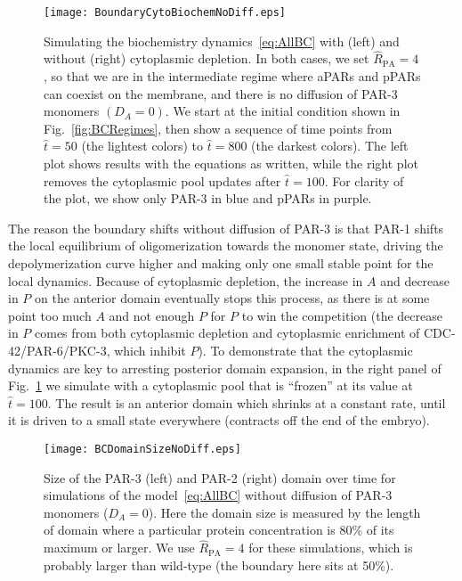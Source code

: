 \documentclass[11pt]{article}
\newcommand{\6}[1]{#1_{\text{6}}}
\newcommand{\3}[1]{#1_{\text{3}}}
\begin{document}
\begin{figure}
\centering
\texttt{[image: BoundaryCytoBiochemNoDiff.eps]}
\caption{\label{fig:BoundaryNoDiff}Simulating the biochemistry dynamics\ \eqref{eq:AllBC} with (left) and without (right) cytoplasmic depletion. In both cases, we set $\hat R_\text{PA}=4$, so that we are in the intermediate regime where aPARs and pPARs can coexist on the membrane, and there is no diffusion of PAR-3 monomers $\left(D_A=0\right)$. We start at the initial condition shown in Fig.\ \ref{fig:BCRegimes}, then show a sequence of time points from $\hat t = 50$ (the lightest colors) to $\hat t = 800$ (the darkest colors). The left plot shows results with the equations as written, while the right plot removes the cytoplasmic pool updates after $\hat t = 100$. For clarity of the plot, we show only PAR-3 in blue and pPARs in purple.}
\end{figure}

The reason the boundary shifts without diffusion of PAR-3 is that PAR-1 shifts the local equilibrium of oligomerization towards the monomer state, driving the depolymerization curve higher and making only one small stable point for the local dynamics. Because of cytoplasmic depletion, the increase in $A$ and decrease in $P$ on the anterior domain eventually stops this process, as there is at some point too much $A$ and not enough $P$ for $P$ to win the competition (the decrease in $P$ comes from both cytoplasmic depletion and cytoplasmic enrichment of CDC-42/PAR-6/PKC-3, which inhibit $P$). To demonstrate that the cytoplasmic dynamics are key to arresting posterior domain expansion, in the right panel of Fig.\ \ref{fig:BoundaryNoDiff} we simulate with a cytoplasmic pool that is ``frozen'' at its value at $\hat t = 100$. The result is an anterior domain which shrinks at a constant rate, until it is driven to a small state everywhere (contracts off the end of the embryo). 



\begin{figure}
\centering
\texttt{[image: BCDomainSizeNoDiff.eps]}
\caption{\label{fig:BCDSNoD} Size of the PAR-3 (left) and PAR-2 (right) domain over time for simulations of the model\ \eqref{eq:AllBC} without diffusion of PAR-3 monomers ($D_A=0$). Here the domain size is measured by the length of domain where a particular protein concentration is 80\% of its maximum or larger. We use $\hat R_\text{PA}=4$ for these simulations, which is probably larger than wild-type (the boundary here sits at 50\%).}
\end{figure}
\end{document}
